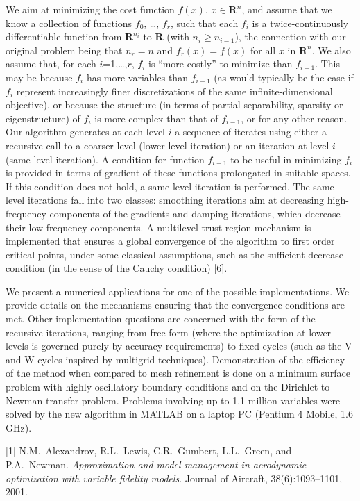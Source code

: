 \documentclass{report}
\begin{document}
We aim at minimizing the cost function $f(x)$, $x \in \mathbf{R}^n$,
and assume that
we know a collection of functions $f_0$, \ldots, $f_r$,
such that each $f_i$ is a twice-continuously differentiable function
from $\mathbf{R}^{n_i}$ to $\mathbf{R}$ (with $n_i \ge n_{i-1}$),
the connection with our original problem being
that $n_r = n$
and $f_r(x) = f(x)$ for all $x$ in $\mathbf{R}^n$. We also assume that, for
each $i$=1,\ldots,$r$, $f_i$ is ``more costly'' to minimize than
$f_{i-1}$.
This may be because $f_i$ has more variables than
$f_{i-1}$ (as would typically be the
case if $f_i$ represent increasingly finer discretizations of the same
infinite-dimensional objective), or because the structure (in terms of
partial separability, sparsity or eigenstructure) of $f_i$ is more complex
than that of $f_{i-1}$, or for any other reason. Our algorithm generates at
each level $i$ a sequence of iterates using either a recursive call to a
coarser level (lower level iteration) or an iteration at level $i$ (same
level iteration). A condition for function $f_{i-1}$ to be useful in
minimizing $f_i$ is provided in terms of gradient of these functions
prolongated in suitable spaces. If this condition does not hold, a same
level iteration is performed. The same level iterations fall into two
classes: smoothing iterations aim at decreasing high-frequency
components of the gradients and damping iterations, which decrease
their low-frequency components. A multilevel trust region mechanism is
implemented that ensures a global convergence of the algorithm to first
order critical points, under some classical assumptions, such as the
sufficient decrease condition (in the sense of the Cauchy condition)
[6].

We present a numerical applications for one of the possible
implementations. We provide details on the mechanisms ensuring that the
convergence conditions are met. Other implementation questions are
concerned with the form of the recursive iterations, ranging from free
form (where the optimization at lower levels is governed purely by
accuracy requirements) to fixed cycles (such as the V and W cycles
inspired by multigrid techniques). Demonstration of the efficiency of
the method when compared to mesh refinement is done on a minimum
surface problem with highly oscillatory boundary conditions and on the
Dirichlet-to-Newman transfer problem. Problems involving up to 1.1
million variables were solved by the new algorithm in MATLAB on a
laptop PC (Pentium 4 Mobile, 1.6 GHz).

[1] N.M.~Alexandrov, R.L.~Lewis, C.R.~Gumbert, L.L.~Green, and
P.A.~Newman. {\em Approximation and model management in aerodynamic optimization
with variable fidelity models}. Journal of Aircraft, 38(6):1093--1101,
2001.
\end{document}
